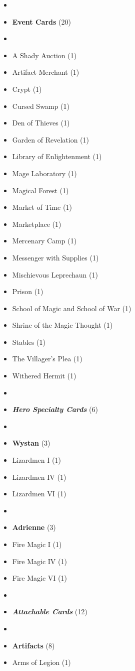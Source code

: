 \begin{multicols*}{3}
\begin{itemize}[leftmargin=0pt, label={}, noitemsep]
  \item
  \item \textbf{Event Cards} (20)
  \item
  \item A Shady Auction (1)
  \item Artifact Merchant (1)
  \item Crypt (1)
  \item Cursed Swamp (1)
  \item Den of Thieves (1)
  \item Garden of Revelation (1)
  \item Library of Enlightenment (1)
  \item Mage Laboratory (1)
  \item Magical Forest (1)
  \item Market of Time (1)
  \item Marketplace (1)
  \item Mercenary Camp (1)
  \item Messenger with Supplies (1)
  \item Mischievous Leprechaun (1)
  \item Prison (1)
  \item School of Magic and School of War (1)
  \item Shrine of the Magic Thought (1)
  \item Stables (1)
  \item The Villager's Plea (1)
  \item Withered Hermit (1)
  \item
  \item \textbf{\emph{Hero Specialty Cards}} (6)
  \item
  \item \textbf{Wystan} (3)
  \item Lizardmen I (1)
  \item Lizardmen IV (1)
  \item Lizardmen VI (1)
  \item
  \item \textbf{Adrienne} (3)
  \item Fire Magic I (1)
  \item Fire Magic IV (1)
  \item Fire Magic VI (1)
  \item
  \item \textbf{\emph{Attachable Cards}} (12)
  \item
  \item \textbf{Artifacts} (8)
  \item Arms of Legion (1)

\end{itemize}
\end{multicols*}
